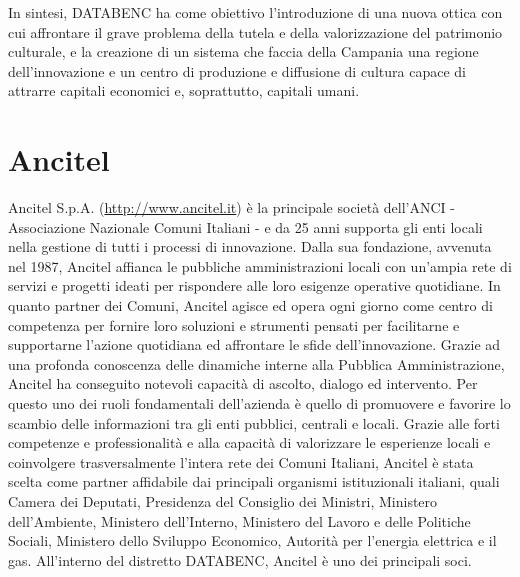 In sintesi, DATABENC ha come obiettivo l'introduzione di una nuova ottica con cui affrontare il grave problema della tutela e della valorizzazione del patrimonio culturale, e la creazione di un sistema che faccia della Campania una regione dell'innovazione e un centro di produzione e diffusione di cultura capace di attrarre capitali economici e, soprattutto, capitali umani.


\section{Ancitel}

Ancitel S.p.A. (\url{http://www.ancitel.it}) è la principale società dell'ANCI - Associazione Nazionale Comuni Italiani - e da 25 anni supporta gli enti locali nella gestione di tutti i processi di innovazione.
Dalla sua fondazione, avvenuta nel 1987,  Ancitel affianca le pubbliche amministrazioni locali con un'ampia rete di servizi e progetti ideati per rispondere alle loro esigenze operative quotidiane.
In quanto partner dei Comuni, Ancitel agisce ed opera ogni giorno come centro di competenza per fornire loro soluzioni e strumenti pensati per facilitarne e supportarne l'azione quotidiana ed affrontare le sfide dell'innovazione. 
Grazie ad una profonda conoscenza delle dinamiche interne alla Pubblica Amministrazione, Ancitel ha conseguito notevoli capacità di ascolto, dialogo ed intervento. Per questo uno dei ruoli fondamentali dell'azienda è quello di promuovere e favorire lo scambio delle informazioni tra gli enti pubblici, centrali e locali.
Grazie alle forti competenze e professionalità e alla capacità di valorizzare le esperienze locali e coinvolgere trasversalmente l'intera rete dei Comuni Italiani, Ancitel è stata scelta come partner affidabile dai principali organismi istituzionali italiani, quali Camera dei Deputati, Presidenza del Consiglio dei Ministri, Ministero dell'Ambiente, Ministero dell'Interno, Ministero del Lavoro e delle Politiche Sociali, Ministero dello Sviluppo Economico, Autorità per l'energia elettrica e il gas.
All'interno del distretto DATABENC, Ancitel è uno dei principali soci. 


